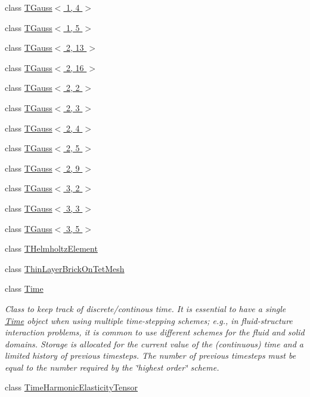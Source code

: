\begin{DoxyCompactItemize}
class \hyperlink{classoomph_1_1TGauss_3_011_00_014_01_4}{T\+Gauss$<$ 1, 4 $>$}
\item 
class \hyperlink{classoomph_1_1TGauss_3_011_00_015_01_4}{T\+Gauss$<$ 1, 5 $>$}
\item 
class \hyperlink{classoomph_1_1TGauss_3_012_00_0113_01_4}{T\+Gauss$<$ 2, 13 $>$}
\item 
class \hyperlink{classoomph_1_1TGauss_3_012_00_0116_01_4}{T\+Gauss$<$ 2, 16 $>$}
\item 
class \hyperlink{classoomph_1_1TGauss_3_012_00_012_01_4}{T\+Gauss$<$ 2, 2 $>$}
\item 
class \hyperlink{classoomph_1_1TGauss_3_012_00_013_01_4}{T\+Gauss$<$ 2, 3 $>$}
\item 
class \hyperlink{classoomph_1_1TGauss_3_012_00_014_01_4}{T\+Gauss$<$ 2, 4 $>$}
\item 
class \hyperlink{classoomph_1_1TGauss_3_012_00_015_01_4}{T\+Gauss$<$ 2, 5 $>$}
\item 
class \hyperlink{classoomph_1_1TGauss_3_012_00_019_01_4}{T\+Gauss$<$ 2, 9 $>$}
\item 
class \hyperlink{classoomph_1_1TGauss_3_013_00_012_01_4}{T\+Gauss$<$ 3, 2 $>$}
\item 
class \hyperlink{classoomph_1_1TGauss_3_013_00_013_01_4}{T\+Gauss$<$ 3, 3 $>$}
\item 
class \hyperlink{classoomph_1_1TGauss_3_013_00_015_01_4}{T\+Gauss$<$ 3, 5 $>$}
\item 
class \hyperlink{classoomph_1_1THelmholtzElement}{T\+Helmholtz\+Element}
\item 
class \hyperlink{classoomph_1_1ThinLayerBrickOnTetMesh}{Thin\+Layer\+Brick\+On\+Tet\+Mesh}
\item 
class \hyperlink{classoomph_1_1Time}{Time}
\begin{DoxyCompactList}\small\item\em Class to keep track of discrete/continous time. It is essential to have a single \hyperlink{classoomph_1_1Time}{Time} object when using multiple time-\/stepping schemes; e.\+g., in fluid-\/structure interaction problems, it is common to use different schemes for the fluid and solid domains. Storage is allocated for the current value of the (continuous) time and a limited history of previous timesteps. The number of previous timesteps must be equal to the number required by the \char`\"{}highest order\char`\"{} scheme. \end{DoxyCompactList}\item 
class \hyperlink{classoomph_1_1TimeHarmonicElasticityTensor}{Time\+Harmonic\+Elasticity\+Tensor}

\end{DoxyCompactItemize}
